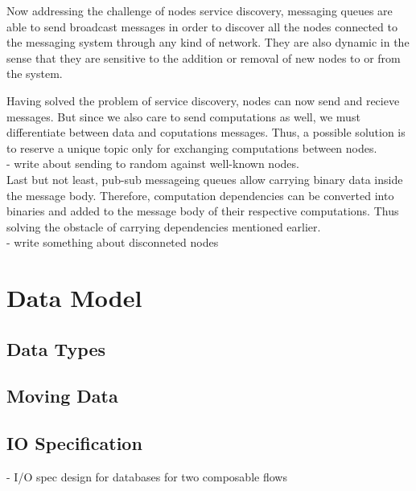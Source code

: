 Now addressing the challenge of nodes service discovery, messaging queues are able to send broadcast messages in order to discover all the nodes connected to the messaging system through any kind of network.  They are also dynamic in the sense that they are sensitive to the addition or removal of new nodes to or from the system. 

Having solved the problem of service discovery, nodes can now send and recieve messages. But since we also care to send computations as well, we must differentiate between data  and coputations messages. Thus, a possible solution is to reserve a unique topic only for exchanging computations between nodes.
\\
- write about sending to random against well-known nodes.
\\
Last but not least, pub-sub messageing queues allow carrying binary data inside the message body. Therefore, computation dependencies can be converted into binaries and added to the message body of their respective computations. Thus solving the obstacle of carrying dependencies mentioned earlier.
\\

 - write something about disconneted nodes
\\
\section{Data Model}

\subsection{Data Types}


\subsection{Moving Data}

\subsection{IO Specification}
- I/O spec design for databases for two composable flows


